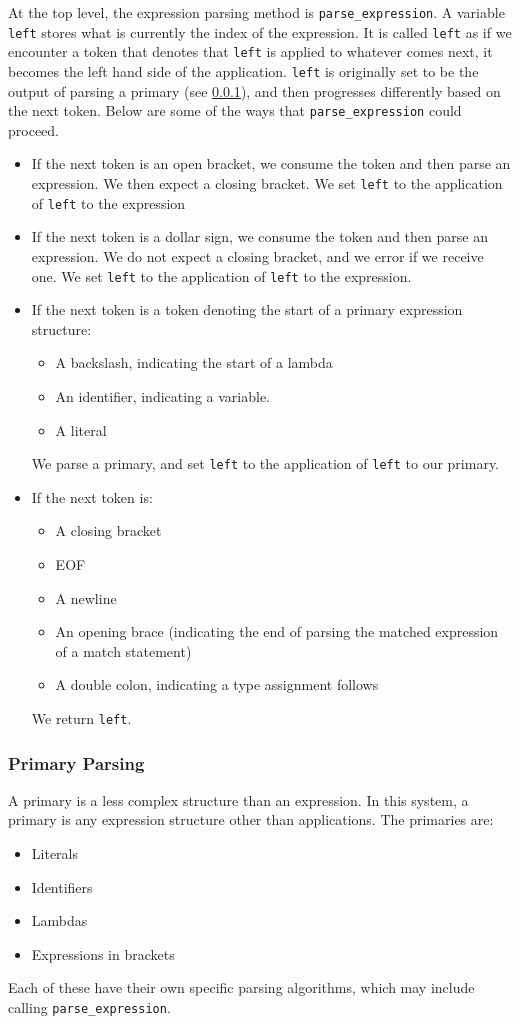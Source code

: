 At the top level, the expression parsing method is \verb|parse_expression|. A variable \verb|left| stores what is currently the index of the expression. It is called \verb|left| as if we encounter a token that denotes that \verb|left| is applied to whatever comes next, it becomes the left hand side of the application. \verb|left| is originally set to be the output of parsing a primary (see \ref{impl:parsing_primary}), and then progresses differently based on the next token.  Below are some of the ways that \verb|parse_expression| could proceed.
\begin{itemize}
    \item If the next token is an open bracket, we consume the token and then parse an expression. We then expect a closing bracket. We set \verb|left| to the application of \verb|left| to the expression
    \item If the next token is a dollar sign, we consume the token and then parse an expression. We do not expect a closing bracket, and we error if we receive one. We set \verb|left| to the application of \verb|left| to the expression.    
    \item If the next token is a token denoting the start of a primary expression structure:
    \begin{itemize}
        \item A backslash, indicating the start of a lambda
        \item An identifier, indicating a variable.
        \item A literal
    \end{itemize}
    We parse a primary, and set \verb|left| to the application of \verb|left| to our primary.
    \item If the next token is:
    \begin{itemize}
        \item A closing bracket
        \item EOF
        \item A newline
        \item An opening brace (indicating the end of parsing the matched expression of a match statement)
        \item A double colon, indicating a type assignment follows
    \end{itemize}
    We return \verb|left|. 
\end{itemize}

\subsubsection{Primary Parsing}
\label{impl:parsing_primary}
A primary is a less complex structure than an expression. In this system, a primary is any expression structure other than applications. The primaries are:
\begin{itemize}
    \item Literals
    \item Identifiers
    \item Lambdas
    \item Expressions in brackets
\end{itemize}
Each of these have their own specific parsing algorithms, which may include calling \verb|parse_expression|. 


